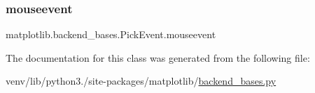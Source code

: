 \mbox{\label{classmatplotlib_1_1backend__bases_1_1PickEvent_a7e31be143b06959f137dc76492d1003a}} 
\subsubsection{\texorpdfstring{mouseevent}{mouseevent}}
{\footnotesize\ttfamily matplotlib.\+backend\+\_\+bases.\+Pick\+Event.\+mouseevent}



The documentation for this class was generated from the following file\+:\begin{DoxyCompactItemize}
\item 
venv/lib/python3./site-\/packages/matplotlib/\hyperlink{backend__bases_8py}{backend\+\_\+bases.\+py}\end{DoxyCompactItemize}
